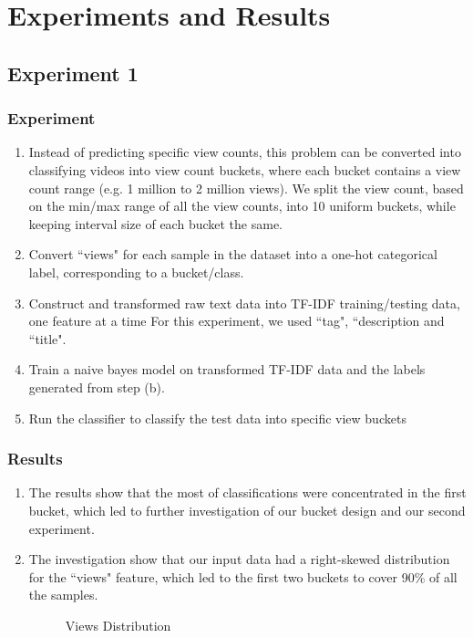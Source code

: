\documentclass[english]{article}
\begin{document}
\begin{enumerate}
\end{enumerate}

\section{Experiments and Results}
\subsection{Experiment 1}
\subsubsection{Experiment}
\begin{enumerate}
\item Instead of predicting specific view counts, this problem can be converted into classifying videos into view count buckets, where each bucket contains a view count range (e.g. 1 million to 2 million views). We split the view count, based on the min/max range of all the view counts, into 10 uniform buckets, while keeping interval size of each bucket the same. 
\item Convert ``views" for each sample in the dataset into a one-hot categorical label, corresponding to a bucket/class.
\item Construct and transformed raw text data into TF-IDF training/testing data, one feature at a time For this experiment, we used ``tag", ``description and ``title". 
\item Train a naive bayes model on transformed TF-IDF data and the labels generated from step (b).
\item Run the classifier to classify the test data into specific view buckets
\end{enumerate}
\subsubsection{Results}
\begin{enumerate}
    \item The results show that the most of classifications were concentrated in the first bucket, which led to further investigation of our bucket design and our second experiment.
    \item The investigation show that our input data had a right-skewed distribution for the ``views" feature, which led to the first two buckets to cover 90\% of all the samples.
    \begin{figure}[H]
        \centering
        
        \caption{Views Distribution}
        \label{fig:my_label}
    \end{figure}
    
\end{enumerate}
\pagebreak
\end{document}
